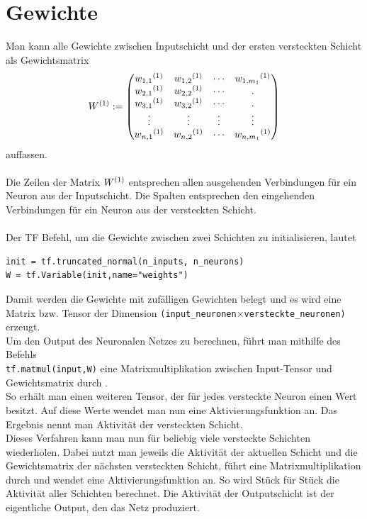 \section{Gewichte}
Man kann alle Gewichte zwischen Inputschicht und der ersten versteckten Schicht als Gewichtsmatrix \begin{equation}
W\textsuperscript{(1)}:=
\begin{pmatrix}
w_{1,1}\textsuperscript{(1)} & w_{1,2}\textsuperscript{(1)} & \cdots & w_{1,m_1}\textsuperscript{(1)} \\
w_{2,1}\textsuperscript{(1)} & w_{2,2}\textsuperscript{(1)}& \cdots & .\\
w_{3,1}\textsuperscript{(1)} & w_{3,2}\textsuperscript{(1)}& \cdots & .\\
\vdots & \vdots & \vdots & \vdots \\
w_{n,1}\textsuperscript{(1)} & w_{n,2}\textsuperscript{(1)} & \cdots & w_{n,m_1}\textsuperscript{(1)}\\
\end{pmatrix} \end{equation}
auffassen.\\\\
Die Zeilen der Matrix $W\textsuperscript{(1)}$ entsprechen allen ausgehenden Verbindungen f\"ur ein Neuron aus der Inputschicht. Die Spalten entsprechen den eingehenden Verbindungen f\"ur ein Neuron aus der versteckten Schicht. \\\\
Der \gls{TF} Befehl, um die Gewichte zwischen zwei Schichten zu initialisieren, lautet \cite{handson}

\vspace{0.3cm}
\begin{lstlisting}
init = tf.truncated_normal(n_inputs, n_neurons)
W = tf.Variable(init,name="weights")
\end{lstlisting}

Damit werden die Gewichte mit zuf\"alligen Gewichten belegt und es wird eine Matrix bzw. Tensor der Dimension \lstinline$(input_neuronen$$ \times $\lstinline$versteckte_neuronen)$ erzeugt.\\
Um den Output des Neuronalen Netzes zu berechnen, f\"uhrt man mithilfe des Befehls\\ \lstinline$tf.matmul(input,W)$ eine Matrixmultiplikation zwischen Input-Tensor und Gewichtsmatrix durch \cite{handson}. \\
So erhält man einen weiteren Tensor, der f\"ur jedes versteckte Neuron einen Wert besitzt. Auf diese Werte wendet man nun eine Aktivierungsfunktion an. Das Ergebnis nennt man Aktivit\"at \cite{Ertel2013} der versteckten Schicht.\\
Dieses Verfahren kann man nun f\"ur beliebig viele versteckte Schichten wiederholen. Dabei nutzt man jeweils die Aktivit\"at der aktuellen Schicht und die Gewichtsmatrix der nächsten versteckten Schicht, führt eine Matrixmultiplikation durch und wendet eine Aktivierungsfunktion an. So wird Stück für Stück die Aktivit\"at aller Schichten berechnet. Die Aktivität der Outputschicht ist der eigentliche Output, den das Netz produziert.


